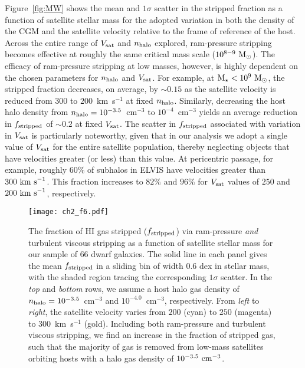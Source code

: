 Figure~\ref{fig:MW} shows the mean and $1\sigma$ scatter in the
stripped fraction as a function of satellite stellar mass for the
adopted variation in both the density of the CGM and the satellite
velocity relative to the frame of reference of the host.
%
Across the entire range of $V_{\rm sat}$ and $n_{\rm halo}$ explored,
ram-pressure stripping becomes effective at roughly the same critical
mass scale ($10^{8-9}~{\rm M}_{\odot}$).
%
The efficacy of ram-pressure stripping at low masses, however, is
highly dependent on the chosen parameters for $n_{\rm halo}$ and
$V_{\rm sat}$.
%
For example, at ${\rm M}_{\star} < 10^{9}~{\rm M}_{\odot}$, the stripped fraction
decreases, on average, by $\sim0.15$ as the satellite velocity is
reduced from $300$ to $200$~km~s$^{-1}$ at fixed $n_{\rm halo}$.
%
Similarly, decreasing the host halo density from $n_{\rm halo} =
10^{-3.5}$~cm$^{-3}$ to $10^{-4}$~cm$^{-3}$ yields an average
reduction in $f_{\rm stripped}$ of $\sim0.2$ at fixed $V_{\rm sat}$.
%
The scatter in $f_{\rm stripped}$ associated with variation in $V_{\rm
  sat}$ is particularly noteworthy, given that in our analysis we
adopt a single value of $V_{\rm sat}$ for the entire satellite
population, thereby neglecting objects that have velocities greater
(or less) than this value. 
%
At pericentric passage, for example, roughly $60\%$ of subhalos in
ELVIS have velocities greater than $300~{\rm km~s}^{-1}$. This
fraction increases to $82\%$ and $96\%$ for $V_{\rm sat}$ values of
$250$ and $200~{\rm km~s}^{-1}$, respectively.



\begin{figure*}
 \centering
 \hspace*{-0.5in}
   \texttt{[image: ch2\_f6.pdf]}
   \caption{The fraction of H{\scriptsize I} gas stripped ($f_{\rm
       stripped}$) via ram-pressure \emph{and} turbulent viscous
     stripping as a function of satellite stellar mass for our sample
     of $66$ dwarf galaxies. The solid line in each panel gives the
     mean $f_{\rm stripped}$ in a sliding bin of width $0.6$ dex in
     stellar mass, with the shaded region tracing the corresponding
     $1\sigma$ scatter. In the \emph{top} and \emph{bottom} rows, we
     assume a host halo gas density of $n_{\rm
       halo}=10^{-3.5}$~cm$^{-3}$ and $10^{-4.0}$~cm$^{-3}$,
     respectively. From \emph{left} to \emph{right}, the satellite
     velocity varies from $200$ (cyan) to $250$ (magenta) to
     $300$~km~s$^{-1}$ (gold). Including both ram-pressure and
     turbulent viscous stripping, we find an increase in the fraction
     of stripped gas, such that the majority of gas is removed from
     low-mass satellites orbiting hosts with a halo gas density of
     $10^{-3.5}~{\rm cm}^{-3}$.} 
 \label{fig:MW_KH}
\end{figure*}


